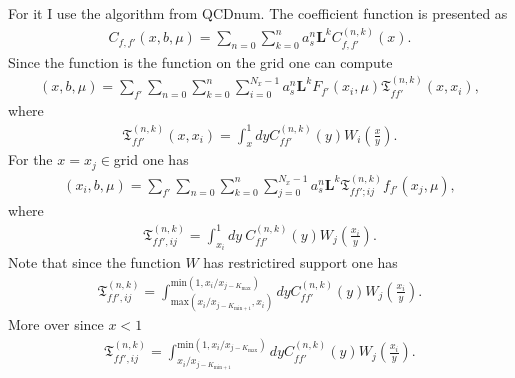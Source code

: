 \documentclass[prd,nofootinbib,eqsecnum,final]{revtex4}
\renewcommand{\(}{\left(}
\renewcommand{\)}{\right)}
\renewcommand{\[}{\left[}
\renewcommand{\]}{\right]}
\begin{document}
For it I use the algorithm from QCDnum. The coefficient function is presented as
\begin{eqnarray}
C_{f,f'}(x,b,\mu)=\sum_{n=0}\sum_{k=0}^n a_s^n \mathbf{L}^k C^{(n,k)}_{f,f'}(x).
\end{eqnarray}
Since the function is the function on the grid one can compute
\begin{eqnarray}
[C\otimes f](x,b,\mu)=\sum_{f'} \sum_{n=0}\sum_{k=0}^n \sum_{i=0}^{N_x-1} a_s^n \mathbf{L}^k F_{f'}(x_i,\mu) 
\mathfrak{T}_{ff'}^{(n,k)}(x,x_i),
\end{eqnarray}
where
\begin{eqnarray}
\mathfrak{T}_{ff'}^{(n,k)}(x,x_i)=\int_x^1 dy C^{(n,k)}_{ff'}(y)W_i\(\frac{x}{y}\).
\end{eqnarray}
For the $x=x_j \in $grid one has
\begin{eqnarray}
[C\otimes f](x_i,b,\mu)=\sum_{f'} \sum_{n=0}\sum_{k=0}^n \sum_{j=0}^{N_x-1} a_s^n \mathbf{L}^k  \mathfrak{T}_{ff';ij}^{(n,k)} f_{f'}(x_j,\mu) 
,
\end{eqnarray}
where
\begin{eqnarray}
\mathfrak{T}_{ff',ij}^{(n,k)}=\int_{x_i}^1 dy~C^{(n,k)}_{ff'}(y)W_j\(\frac{x_i}{y}\).
\end{eqnarray}
Note that since the function $W$ has restrictired support one has
\begin{eqnarray}
\mathfrak{T}_{ff',ij}^{(n,k)}=
\int^{\text{min}(1,x_i/x_{j-K_{\text{max}}})}_{\text{max}(x_i/x_{j-K_{\text{min}+1}},x_i)} dy C^{(n,k)}_{ff'}(y)W_j\(\frac{x_i}{y}\).
\end{eqnarray}
More over since $x<1$
\begin{eqnarray}
\mathfrak{T}_{ff',ij}^{(n,k)}=
\int^{\text{min}(1,x_i/x_{j-K_{\text{max}}})}_{x_i/x_{j-K_{\text{min}+1}}} dy C^{(n,k)}_{ff'}(y)W_j\(\frac{x_i}{y}\).
\end{eqnarray}
\end{document}
